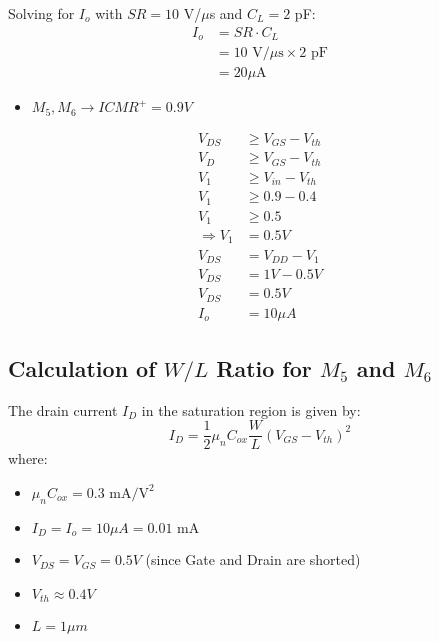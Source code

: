 Solving for $I_o$ with $SR = 10$ V/$\mu$s and $C_L = 2$ pF:
\begin{align*}
    I_o &= SR \cdot C_L \\
        &= 10 \text{ V}/\mu\text{s} \times 2\text{ pF} \\
        &= 20 \mu\text{A}
\end{align*}

\begin{itemize}
    \item $M_5, M_6 \rightarrow ICMR^+ = 0.9V$
\end{itemize}

\begin{align*}
    V_{DS} &\geq V_{GS} - V_{th} \\
    V_D &\geq V_{GS} - V_{th} \\
    V_1 &\geq V_{in} - V_{th} \\
    V_1 &\geq 0.9 - 0.4 \\
    V_1 &\geq 0.5 \\
    \Rightarrow V_1 &= 0.5V \\
    V_{DS} &= V_{DD} - V_1 \\
    V_{DS} &= 1V - 0.5V \\
    V_{DS} &= 0.5V \\
    I_o &= 10\mu A
\end{align*}

\subsection{Calculation of $W/L$ Ratio for $M_5$ and $M_6$}

The drain current $I_D$ in the saturation region is given by:
\begin{equation}
    I_D = \frac{1}{2} \mu_n C_{ox} \frac{W}{L} (V_{GS} - V_{th})^2
\end{equation}
where:
\begin{itemize}
    \item $\mu_n C_{ox} = 0.3 \text{ mA}/\text{V}^2$
    \item $I_D = I_o = 10 \mu A = 0.01 \text{ mA}$
    \item $V_{DS} = V_{GS} = 0.5V$ (since Gate and Drain are shorted)
    \item $V_{th} \approx 0.4V$
    \item $L = 1 \mu m$
\end{itemize}

